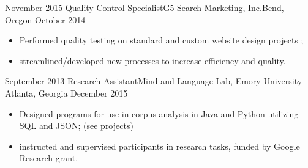 \begin{experiences}
{\begin{itemize}
                      \end{itemize}
                    }
  \emptySeparator
  \experiencetech
    {November 2015}     {Quality Control Specialist}{G5 Search Marketing, Inc.}{Bend, Oregon}
    {October 2014}    {
                      \begin{itemize}
                        \item Performed quality testing on standard and custom website design projects ;
                        \item streamlined/developed new processes to increase efficiency and quality.
                      \end{itemize}
                    }
  \emptySeparator
    \experiencetech
    {September 2013} {Research Assistant}{Mind and Language Lab, Emory University }{Atlanta, Georgia}
    {December 2015}    {
                      \begin{itemize}
                        \item Designed programs for use in corpus analysis in Java and Python utilizing SQL and JSON; (see projects)
                        \item instructed and supervised participants in research tasks, funded by Google Research grant.                
                      \end{itemize}
                    }
  \emptySeparator

\end{experiences}
